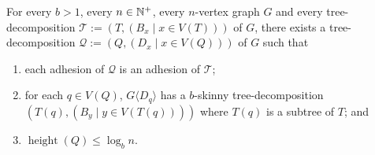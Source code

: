 \documentclass{patmorin}
\renewcommand{\le}{\leqslant}
\renewcommand{\leq}{\leqslant}
\newcommand{\piotr}[1]{\noindent\textcolor{red}{PiMi: #1}}
\newcommand{\torso}[2]{{#1}\langle{#2}\rangle}
\DeclareMathOperator{\height}{height}
\DeclareMathOperator{\depth}{depth}
\begin{document}
  \begin{cor}\label{b_skinny_decomp}
    For every $b>1$, every $n\in\mathbb{N}^+$, every $n$-vertex graph $G$ and every tree-decomposition $\mathcal{T}:=(T,(B_x\mid x\in V(T)))$ of $G$, there exists a tree-decomposition $\mathcal{Q}:=(Q,(D_x\mid x\in V(Q)))$ of $G$ such that
    \begin{enumerate}[nosep,nolistsep,label=\rm(\alph*)]
      \item\label{prop_adhesion}
      each adhesion of $\mathcal{Q}$ is an adhesion of $\mathcal{T}$;
      \item\label{prop_skinny_torso} for each $q\in V(Q)$, $\torso{G}{D_q}$ has a $b$-skinny tree-decomposition $(T(q), (B_y\mid y\in V(T(q))))$ where $T(q)$ is a subtree of $T$; and
      \item\label{prop_geometric} $\height(Q)\le \log_b n$.
    \end{enumerate}
  \end{cor}
\end{document}
